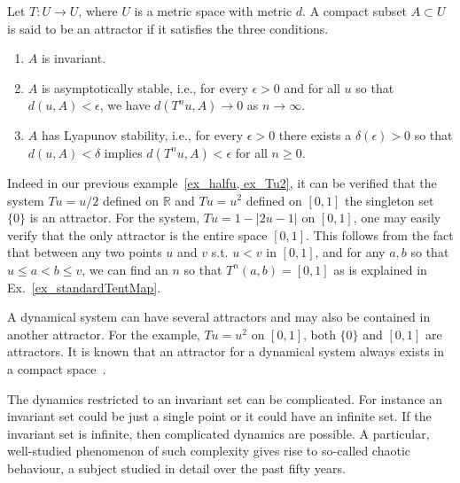 \begin{Definition}
  [\bf Attractor]\label{Dfn_Attractor}\rm
  Let $T: U \to U$, where $U$  is a metric space with metric $d$. A compact subset $A \subset U$ is said to be an attractor if it satisfies the three conditions.
  \vspace{-8mm}
  \begin{enumerate}
	\item $A$ is invariant. 
	\item $A$ is asymptotically stable, i.e., for every $\epsilon > 0$ and for all $u$ so that $d(u,A) < \epsilon$, we have $d(T^nu,A){\to}{0}$ as $n\to \infty$. 
	\item $A$ has Lyapunov stability, i.e., for every $\epsilon > 0$  there exists a $\delta(\epsilon) > 0$ so that $d(u,A) < \delta$ implies $d(T^nu,A) < \epsilon$ for all $n\ge 0$.  
\end{enumerate}
\end{Definition} 

Indeed in our previous example~\ref{ex_halfu, ex_Tu2}, it can be verified that the system  $Tu=u/2$ defined on  $\mathbb{R}$ and $Tu=u^2$ defined on $[0,1]$  the singleton set $\{0\}$ is an attractor.  For the system,  $Tu=1-|2u-1|$ on $[0,1]$, one may easily verify that the only attractor is the entire space $[0,1]$. This follows from the fact that between any two points $u$ and $v$ s.t. $u< v$ in $[0,1]$, and for any $a,b$ so that $u\le a < b \le v$, we can find an $n$ so that $T^n(a,b)=[0,1]$  as is explained in Ex.~\ref{ex_standardTentMap}. 

A dynamical system can have several attractors and may also be contained in another attractor. For the example, $Tu =u^2$ on $[0,1]$, both $\{0\}$ and $[0,1]$ are attractors. It is known that an attractor for a dynamical system always exists in a compact space~\cite{Milnor1985}.

The dynamics restricted to an invariant set can be complicated. For instance an invariant set could be just a single point or it could have an infinite set. If the invariant set is infinite, then complicated dynamics are possible. A particular, well-studied phenomenon of such complexity gives rise to so-called chaotic behaviour, a subject studied in detail over the past fifty years.


